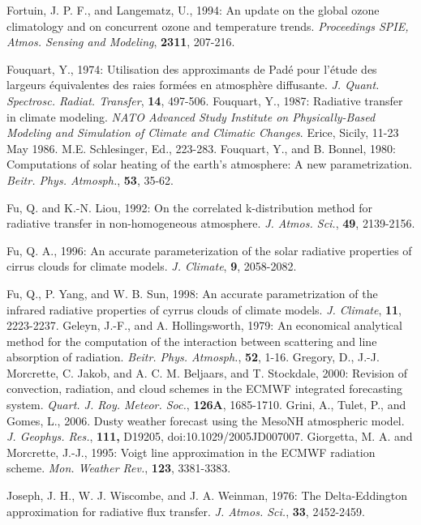 \decrefname
Fortuin, J. P. F., and Langematz, U., 1994: An update on the global ozone climatology and on concurrent ozone and temperature trends.
{\it Proceedings SPIE, Atmos. Sensing and Modeling},
{\bf 2311}, 207-216.

\decrefname
Fouquart, Y., 1974:
      Utilisation des approximants de Pad\'e pour l'\'etude des largeurs
      \'equivalentes des raies form\'ees en atmosph\`ere diffusante.
      {\it J. Quant. Spectrosc. Radiat. Transfer},
      {\bf 14},
      497-506.
\decrefname
Fouquart, Y., 1987:
      Radiative transfer in climate modeling.
      {\it NATO Advanced Study Institute on Physically-Based Modeling and
      Simulation of Climate and Climatic Changes}.
      Erice, Sicily, 11-23 May 1986. M.E. Schlesinger, Ed.,
      223-283.
\decrefname
Fouquart, Y., and B. Bonnel, 1980:
      Computations of solar heating of the earth's atmosphere: A new
      parametrization.
      {\it Beitr. Phys. Atmosph.},
      {\bf 53},
      35-62.

\decrefname
Fu, Q. and K.-N. Liou, 1992: On the correlated k-distribution method for radiative transfer in non-homogeneous atmosphere.
{\it  J. Atmos. Sci.}, {\bf 49}, 2139-2156.

\decrefname
Fu, Q. A., 1996: An accurate parameterization of the solar radiative properties of cirrus clouds for climate models.
{\it  J. Climate}, {\bf 9}, 2058-2082.

\decrefname
Fu, Q., P. Yang, and W. B. Sun, 1998: An accurate parametrization of the infrared radiative properties of cyrrus clouds of climate models.
{\it  J. Climate}, {\bf 11}, 2223-2237.
\decrefname
Geleyn, J.-F., and A. Hollingsworth, 1979:
      An economical analytical method for the computation of the interaction
      between scattering and line absorption of radiation.
      {\it Beitr. Phys. Atmosph.},
      {\bf 52},
      1-16.
\decrefname
Gregory, D., J.-J. Morcrette, C. Jakob, and A. C. M. Beljaars, and T. Stockdale,
2000: Revision of convection, radiation, and cloud schemes in the ECMWF
integrated forecasting system.
{\it  Quart. J. Roy. Meteor. Soc.},
{\bf 126A}, 1685-1710.
\decrefname
Grini, A., Tulet, P., and Gomes, L., 2006.
Dusty weather forecast using the MesoNH atmospheric model.
{\it  J. Geophys. Res.}, {\bf 111,} D19205, doi:10.1029/2005JD007007.
\decrefname
Giorgetta, M. A. and Morcrette, J.-J., 1995:
Voigt line approximation in the ECMWF radiation scheme. 
{\it Mon. Weather Rev.},
{\bf 123}, 3381-3383.

\decrefname
Joseph, J. H., W. J. Wiscombe, and J. A. Weinman, 1976:
      The Delta-Eddington approximation for radiative flux transfer.
      {\it J. Atmos. Sci.},
      {\bf 33},
      2452-2459.

